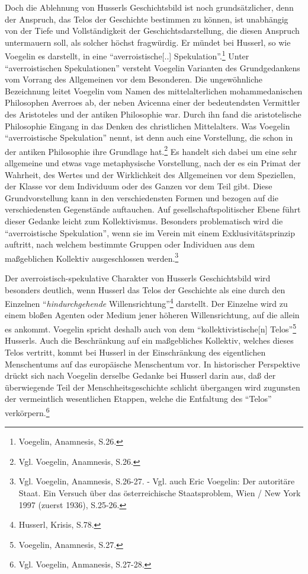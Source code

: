 Doch die Ablehnung von Husserls Geschichtsbild ist noch grundsätzlicher, denn
der Anspruch, das Telos der Geschichte bestimmen zu können, ist unabhängig von
der Tiefe und Vollständigkeit der Geschichtsdarstellung, die diesen Anspruch
untermauern soll, als solcher höchst fragwürdig. Er mündet bei Husserl, so wie
Voegelin es darstellt, in eine "`averroistische[..]
Spekulation"'.\footnote{Voegelin, Anamnesis, S.26.} Unter "`averroistischen
Spekulationen"' versteht Voegelin Varianten des Grundgedankens vom Vorrang des
Allgemeinen vor dem Besonderen. Die ungewöhnliche Bezeichnung leitet Voegelin
vom Namen des mittelalterlichen mohammedanischen Philosophen Averroes ab, der
neben Avicenna einer der bedeutendsten Vermittler des Aristoteles und der
antiken Philosophie war. Durch ihn fand die aristotelische Philosophie Eingang
in das Denken des christlichen Mittelalters. Was Voegelin "`averroistische
Spekulation"' nennt, ist denn auch eine Vorstellung, die schon in der antiken
Philosophie ihre Grundlage hat.\footnote{Vgl. Voegelin, Anamnesis, S.26.} Es
handelt sich dabei um eine sehr allgemeine und etwas vage metaphysische
Vorstellung, nach der es ein Primat der Wahrheit, des Wertes und der
Wirklichkeit des Allgemeinen vor dem Speziellen, der Klasse vor dem Individuum
oder des Ganzen vor dem Teil gibt. Diese Grundvorstellung kann in den
verschiedensten Formen und bezogen auf die verschiedensten Gegenstände
auftauchen. Auf gesellschaftspolitischer Ebene führt dieser Gedanke leicht zum
Kollektivismus. Besonders problematisch wird die "`averroistische
Spekulation"', wenn sie im Verein mit einem Exklusivitätsprinzip auftritt,
nach welchem bestimmte Gruppen oder Individuen aus dem maßgeblichen Kollektiv
ausgeschlossen werden.\footnote{Vgl. Voegelin, Anamnesis, S.26-27. - Vgl. auch
  Eric Voegelin: Der autoritäre Staat. Ein Versuch über das österreichische
  Staatsproblem, Wien / New York 1997 (zuerst 1936), S.25-26.}

Der averroistisch-spekulative Charakter von Husserls Geschichtsbild wird
besonders deutlich, wenn Husserl das Telos der Geschichte als eine durch den
Einzelnen "`{\it hindurchgehende} Willensrichtung"'\footnote{Husserl, Krisis,
  S.78.} darstellt. Der Einzelne wird zu einem bloßen Agenten oder Medium
jener höheren Willensrichtung, auf die allein es ankommt. Voegelin spricht
deshalb auch von dem "`kollektivistische[n] Telos"'\footnote{Voegelin,
  Anamnesis, S.27.} Husserls. Auch die Beschränkung auf ein maßgebliches
Kollektiv, welches dieses Telos vertritt, kommt bei Husserl in der
Einschränkung des eigentlichen Menschentums auf das europäische Menschentum
vor. In historischer Perspektive drückt sich nach Voegelin derselbe Gedanke
bei Husserl darin aus, daß der überwiegende Teil der Menschheitsgeschichte
schlicht übergangen wird zugunsten der vermeintlich wesentlichen Etappen,
welche die Entfaltung des "`Telos"' verkörpern.\footnote{Vgl. Voegelin,
  Anmanesis, S.27-28.}

